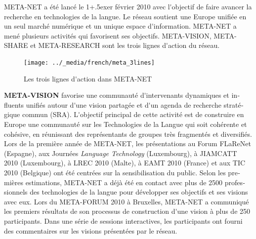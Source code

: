 \begin{french}
\begin{multicols}{2}
META-NET a été lancé le 1\raise+.5ex\hbox{er} février 2010 avec l{\mbox '}objectif de faire avancer la recherche en technologies de la langue. Le réseau soutient une Europe unifiée en un seul marché numérique et un unique espace d{\mbox '}information. META-NET a mené plusieurs activités qui favorisent ses objectifs. META-VISION, META-SHARE et META-RESEARCH sont les trois lignes d{\mbox '}action du réseau.

\begin{figure}[!ht]
\begin{center}
  \texttt{[image: ../\_media/french/meta\_3lines]}\\
  \caption{Les trois lignes d{\mbox '}action dans META-NET}
  \label{fig:metanetactionlines}
\end{center}
\end{figure}

\textbf{META-VISION} favorise une communauté d{\mbox '}intervenants dynamiques et influents unifiés autour d{\mbox '}une vision partagée et d{\mbox '}un agenda de recherche stratégique commun (SRA). L{\mbox '}objectif principal de cette activité est de construire en Europe une communauté sur les Technologies de la Langue qui soit cohérente et cohésive, en réunissant des représentants de groupes très fragmentés et diversifiés. Lors de la première année de META-NET, les présentations au Forum FLaReNet (Espagne), aux Journées {\it Language Technology} (Luxembourg), à JIAMCATT 2010 (Luxembourg), à LREC 2010 (Malte), à EAMT 2010 (France) et aux TIC 2010 (Belgique) ont été centrées sur la sensibilisation du public. Selon les premières estimations, META-NET a déjà été en contact avec plus de 2500 professionnels des technologies de la langue pour développer ses objectifs et ses visions avec eux. Lors du META-FORUM 2010 à Bruxelles, META-NET a communiqué les premiers résultats de son processus de construction d{\mbox '}une vision à plus de 250 participants. Dans une série de sessions interactives, les participants ont fourni des commentaires sur les visions présentées par le réseau.


\end{multicols}
\end{french}
